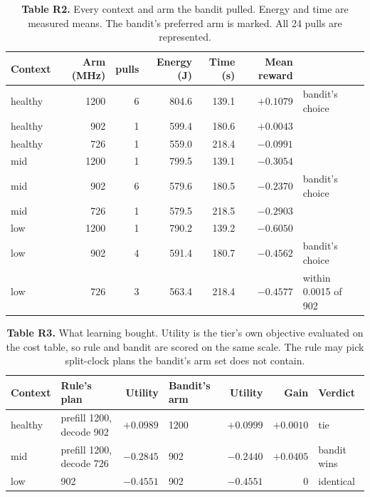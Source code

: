 \documentclass[10pt]{article}
\newcommand{\good}[1]{\textcolor{kvgreen}{\textbf{#1}}}
\begin{document}
\begin{table}[h]\centering\small
\caption*{\textbf{Table R2.} Every context and arm the bandit pulled. Energy and time are measured means.
The bandit's preferred arm is marked. All 24 pulls are represented.}
\begin{tabular}{l r r r r r l}
\toprule
\textbf{Context} & \textbf{Arm (MHz)} & \textbf{pulls} & \textbf{Energy (J)} & \textbf{Time (s)} & \textbf{Mean reward} & \\
\midrule
healthy & 1200 & 6 & 804.6 & 139.1 & \good{$+0.1079$} & bandit's choice \\
healthy & 902  & 1 & 599.4 & 180.6 & $+0.0043$ & \\
healthy & 726  & 1 & 559.0 & 218.4 & $-0.0991$ & \\
\midrule
mid & 1200 & 1 & 799.5 & 139.1 & $-0.3054$ & \\
mid & 902  & 6 & 579.6 & 180.5 & \good{$-0.2370$} & bandit's choice \\
mid & 726  & 1 & 579.5 & 218.5 & $-0.2903$ & \\
\midrule
low & 1200 & 1 & 790.2 & 139.2 & $-0.6050$ & \\
low & 902  & 4 & 591.4 & 180.7 & \good{$-0.4562$} & bandit's choice \\
low & 726  & 3 & 563.4 & 218.4 & $-0.4577$ & within 0.0015 of 902 \\
\bottomrule
\end{tabular}
\end{table}

\clearpage
\begin{table}[h]\centering\small
\caption*{\textbf{Table R3.} What learning bought. Utility is the tier's own objective evaluated on the
cost table, so rule and bandit are scored on the same scale. The rule may pick split-clock plans the
bandit's arm set does not contain.}
\begin{tabular}{l l r l r r l}
\toprule
\textbf{Context} & \textbf{Rule's plan} & \textbf{Utility} & \textbf{Bandit's arm} & \textbf{Utility} & \textbf{Gain} & \textbf{Verdict} \\
\midrule
healthy & prefill 1200, decode 902 & $+0.0989$ & 1200 & $+0.0999$ & $+0.0010$ & tie \\
mid     & prefill 1200, decode 726 & $-0.2845$ & 902  & \good{$-0.2440$} & \good{$+0.0405$} & bandit wins \\
low     & 902                      & $-0.4551$ & 902  & $-0.4551$ & $0$ & identical \\
\bottomrule
\end{tabular}
\end{table}
\end{document}
